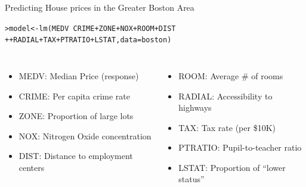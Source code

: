 \documentclass{beamer}\usepackage[]{graphicx}\usepackage[]{color}
\makeatletter
\newcommand{\hlopt}[1]{\textcolor[rgb]{1,0.894,0.769}{#1}}%
\newcommand{\hlstd}[1]{\textcolor[rgb]{1,0.894,0.769}{#1}}%
\newcommand{\hlkwb}[1]{\textcolor[rgb]{0.804,0.776,0.451}{#1}}%
\newcommand{\hlkwc}[1]{\textcolor[rgb]{0.78,0.941,0.545}{#1}}%
\newcommand{\hlkwd}[1]{\textcolor[rgb]{1,0.78,0.769}{#1}}%
\newenvironment{kframe}{%
 \def\at@end@of@kframe{}%
 \ifinner\ifhmode%
  \def\at@end@of@kframe{\end{minipage}}%
  \begin{minipage}{\columnwidth}%
 \fi\fi%
 \def\FrameCommand##1{\hskip\@totalleftmargin \hskip-\fboxsep
 \colorbox{shadecolor}{##1}\hskip-\fboxsep
     \hskip-\linewidth \hskip-\@totalleftmargin \hskip\columnwidth}%
 \MakeFramed {\advance\hsize-\width
   \@totalleftmargin\z@ \linewidth\hsize
   \@setminipage}}%
 {\par\unskip\endMakeFramed%
 \at@end@of@kframe}
\newenvironment{knitrout}{}{} %
\makeatother
\begin{document}
\begin{darkframes}
\begin{frame}[fragile]{Predicting House prices in the Greater Boston Area}
\begin{knitrout}
\begin{kframe}
\begin{alltt}
\hlstd{> }\hlstd{model} \hlkwb{<-} \hlkwd{lm}\hlstd{(MEDV} \hlopt{~} \hlstd{CRIME}\hlopt{+}\hlstd{ZONE}\hlopt{+}\hlstd{NOX}\hlopt{+}\hlstd{ROOM}\hlopt{+}\hlstd{DIST}
\hlstd{+ }                  \hlopt{+}\hlstd{RADIAL}\hlopt{+}\hlstd{TAX}\hlopt{+}\hlstd{PTRATIO}\hlopt{+}\hlstd{LSTAT,} \hlkwc{data}\hlstd{=boston)}
\end{alltt}
\end{kframe}
\end{knitrout}
      \begin{columns}[onlytextwidth]
          \begin{itemize}
            \item MEDV: Median Price (response)
            \item CRIME: Per capita crime rate
            \item ZONE: Proportion of large lots
            \item NOX: Nitrogen Oxide concentration
            \item DIST: Distance to employment centers
          \end{itemize}
          \begin{itemize}
            \item ROOM: Average \# of rooms
            \item RADIAL: Accessibility to highways
            \item TAX: Tax rate (per \$10K)
            \item PTRATIO: Pupil-to-teacher ratio
            \item LSTAT: Proportion of ``lower status''
          \end{itemize}
      \end{columns}
    \end{frame}
    
   
   
\end{darkframes}
\end{document}

